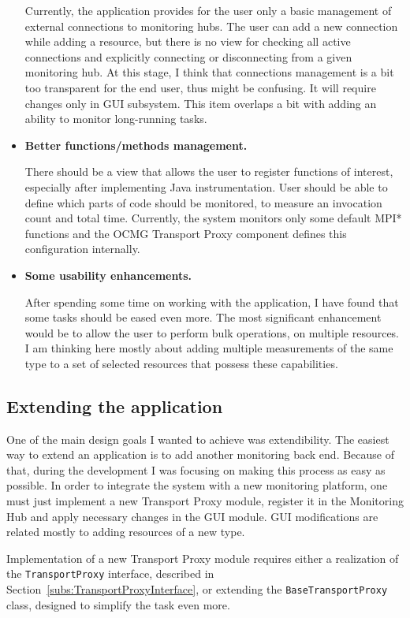 \begin{itemize}
Currently, the application provides for the user only a basic management of external connections to monitoring hubs. The user can add a new connection while adding a resource, but there is no view for checking all active connections and explicitly connecting or disconnecting from a given monitoring hub. At this stage, I think that connections management is a bit too transparent for the end user, thus might be confusing. It will require changes only in GUI subsystem. This item overlaps a bit with adding an ability to monitor long-running tasks.

\item{\bf Better functions/methods management.}

There should be a view that allows the user to register functions of interest, especially after implementing Java instrumentation. User should be able to define which parts of code should be monitored, to measure an invocation count and total time. Currently, the system monitors only some default MPI* functions and the OCMG Transport Proxy component defines this configuration internally.

\item {\bf Some usability enhancements.}

After spending some time on working with the application, I have found that some tasks should be eased even more. The most significant enhancement would be to allow the user to perform bulk operations, on multiple resources. I am thinking here mostly about adding multiple measurements of the same type to a set of selected resources that possess these capabilities.

\end{itemize}

\subsection{Extending the application}

One of the main design goals I wanted to achieve was extendibility. The easiest way to extend an application is to add another monitoring back end. Because of that, during the development I was focusing on making this process as easy as possible. In order to integrate the system with a new monitoring platform, one must just implement a new Transport Proxy module, register it in the Monitoring Hub and apply necessary changes in the GUI module. GUI modifications are related mostly to adding resources of a new type.

Implementation of a new Transport Proxy module requires either a realization of the \texttt{TransportProxy} interface, described in Section~\ref{subs:TransportProxyInterface}, or extending the \texttt{BaseTransportProxy} class, designed to simplify the task even more.

